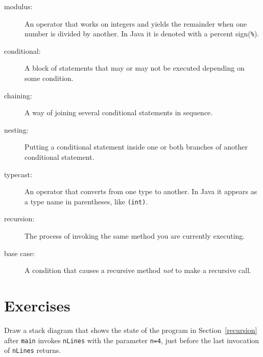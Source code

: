 \begin{description}

\item[modulus:]  An operator that works on integers and yields
the remainder when one number is divided by another.  In Java
it is denoted with a percent sign({\tt \%}).

\item[conditional:]  A block of statements that may or may not
be executed depending on some condition.

\item[chaining:]  A way of joining several conditional statements
in sequence.

\item[nesting:] Putting a conditional statement inside one or both
branches of another conditional statement.

\item[typecast:]  An operator that converts from one type to another.
In Java it appears as a type name in parentheses, like {\tt(int)}.

\item[recursion:]  The process of invoking the same method you
are currently executing.

\item[base case:] A condition that causes a recursive method {\em not}
  to make a recursive call.



\end{description}

\section{Exercises}

\begin{exercise}
Draw a stack diagram that shows the state of the program in Section~\ref{recursion}
after {\tt main} invokes {\tt nLines} with the parameter {\tt n=4},
just before the last invocation of {\tt nLines} returns.
\end{exercise}

